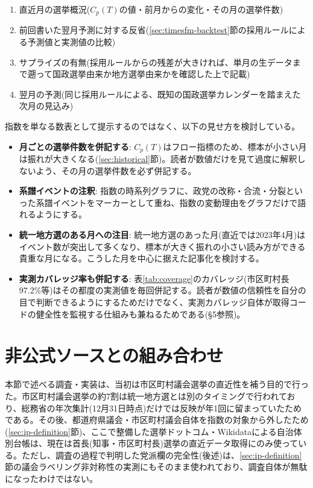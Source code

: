 \documentclass[a4paper,11pt]{ltjsarticle}
\begin{document}
\begin{enumerate}
  \item 直近月の選挙概況($C_p(T)$の値・前月からの変化・その月の選挙件数)
  \item 前回書いた翌月予測に対する反省(\ref{sec:timesfm-backtest}節の採用ルールによる予測値と実測値の比較)
  \item サプライズの有無(採用ルールからの残差が大きければ、単月の生データまで遡って国政選挙由来か地方選挙由来かを確認した上で記載)
  \item 翌月の予測(同じ採用ルールによる、既知の国政選挙カレンダーを踏まえた次月の見込み)
\end{enumerate}

指数を単なる数表として提示するのではなく、以下の見せ方を検討している。

\begin{itemize}
  \item \textbf{月ごとの選挙件数を併記する}: $C_p(T)$はフロー指標のため、標本が小さい月は振れが大きくなる(\ref{sec:historical}節)。読者が数値だけを見て過度に解釈しないよう、その月の選挙件数を必ず併記する。
  \item \textbf{系譜イベントの注釈}: 指数の時系列グラフに、政党の改称・合流・分裂といった系譜イベントをマーカーとして重ね、指数の変動理由をグラフだけで語れるようにする。
  \item \textbf{統一地方選のある月への注目}: 統一地方選のあった月(直近では2023年4月)はイベント数が突出して多くなり、標本が大きく振れの小さい読み方ができる貴重な月になる。こうした月を中心に据えた記事化を検討する。
  \item \textbf{実測カバレッジ率も併記する}: 表\ref{tab:coverage}のカバレッジ(市区町村長97.2\%等)はその都度の実測値を毎回併記する。読者が数値の信頼性を自分の目で判断できるようにするためだけでなく、実測カバレッジ自体が取得コードの健全性を監視する仕組みも兼ねるためである(\S5参照)。
\end{itemize}

\section{非公式ソースとの組み合わせ}

本節で述べる調査・実装は、当初は市区町村議会選挙の直近性を補う目的で行った。市区町村議会選挙の約7割は統一地方選とは別のタイミングで行われており、総務省の年次集計(12月31日時点)だけでは反映が年1回に留まっていたためである。その後、都道府県議会・市区町村議会自体を指数の対象から外したため(\ref{sec:ip-definition}節)、ここで整備した選挙ドットコム・Wikidataによる自治体別台帳は、現在は首長(知事・市区町村長)選挙の直近データ取得にのみ使っている。ただし、調査の過程で判明した党派欄の完全性(後述)は、\ref{sec:ip-definition}節の議会ラベリング非対称性の実測にもそのまま使われており、調査自体が無駄になったわけではない。
\end{document}
